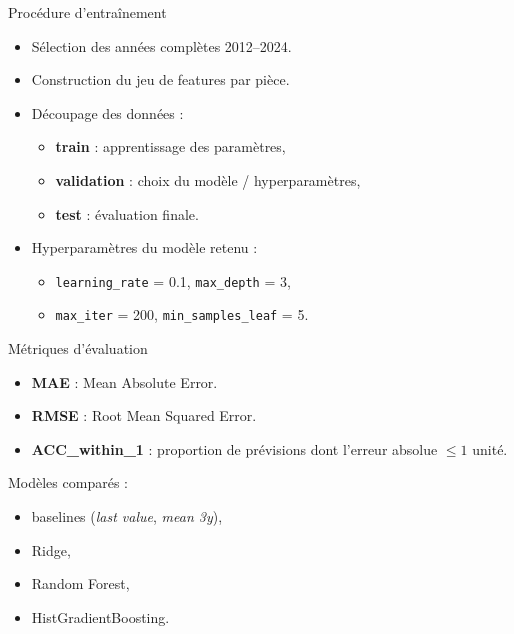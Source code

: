 \documentclass[aspectratio=169]{beamer}
\begin{document}
\begin{frame}{Procédure d'entraînement}
  \begin{itemize}
    \item Sélection des années complètes 2012--2024.
    \item Construction du jeu de features par pièce.
    \item Découpage des données :
      \begin{itemize}
        \item \textbf{train} : apprentissage des paramètres,
        \item \textbf{validation} : choix du modèle / hyperparamètres,
        \item \textbf{test} : évaluation finale.
      \end{itemize}
    \item Hyperparamètres du modèle retenu :
      \begin{itemize}
        \item \texttt{learning\_rate} = 0.1, \texttt{max\_depth} = 3,
        \item \texttt{max\_iter} = 200, \texttt{min\_samples\_leaf} = 5.
      \end{itemize}
  \end{itemize}
\end{frame}

\begin{frame}{Métriques d'évaluation}
  \begin{itemize}
    \item \textbf{MAE} : Mean Absolute Error.
    \item \textbf{RMSE} : Root Mean Squared Error.
    \item \textbf{ACC\_within\_1} : proportion de prévisions dont l'erreur absolue $\leq 1$ unité.
  \end{itemize}
  \vspace{0.5em}
  Modèles comparés :
  \begin{itemize}
    \item baselines (\textit{last value}, \textit{mean 3y}),
    \item Ridge,
    \item Random Forest,
    \item HistGradientBoosting.
  \end{itemize}
\end{frame}
\end{document}
